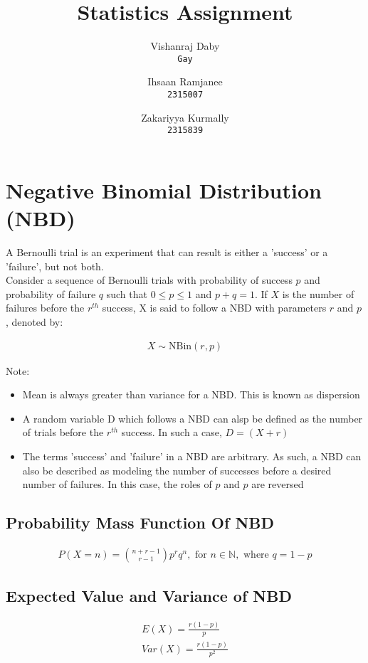 \documentclass{article}
\author{
  Vishanraj Daby \\
  \texttt{Gay}
  \and
  Ihsaan Ramjanee \\
  \texttt{2315007}
  \and
  Zakariyya Kurmally \\
  \texttt{2315839}
}
\title{Statistics Assignment}
\begin{document}
\maketitle

\pagebreak

\tableofcontents

\pagebreak

\section{Negative Binomial Distribution (NBD)}
A Bernoulli trial is an experiment that can result is either a
'success' or a 'failure', but not both. \\

Consider a sequence of Bernoulli trials with probability of success
$ p $ and probability of failure $ q $ such that $ 0 \leq p \leq 1 $
and $ p + q = 1 $. If $ X $ is the number of failures before the
$ r^{th} $ success, X is said to follow a NBD with parameters $ r $
and $ p $, denoted by:

\begin{gather*}
  X \sim \text{NBin}(r, p)
\end{gather*}

Note:
\begin{itemize}
  \item Mean is always greater than variance for a NBD. This is 
    known as dispersion
  \item A random variable D which follows a NBD can alsp be defined
    as the number of trials before the $ r^{th} $ success. In such a
    case, $ D = (X + r) $
  \item The terms 'success' and 'failure' in a NBD are arbitrary.
    As such, a NBD can also be described as modeling the number
    of successes before a desired number of failures. In this case,
    the roles of $p$ and $p$ are reversed
\end{itemize}


\subsection{Probability Mass Function Of NBD}

\begin{gather*}
  P(X = n) = {{n + r - 1} \choose {r - 1}} p^r q^n, 
  \text{ for } n \in \mathbb{N}, \text{ where } q = 1-p
\end{gather*}

\subsection{Expected Value and Variance of NBD}
\begin{gather*}
  E(X) = \frac{r(1-p)}{p} \\[5pt]
  Var(X) = \frac{r(1-p)}{p^2}
\end{gather*}
\end{document}
